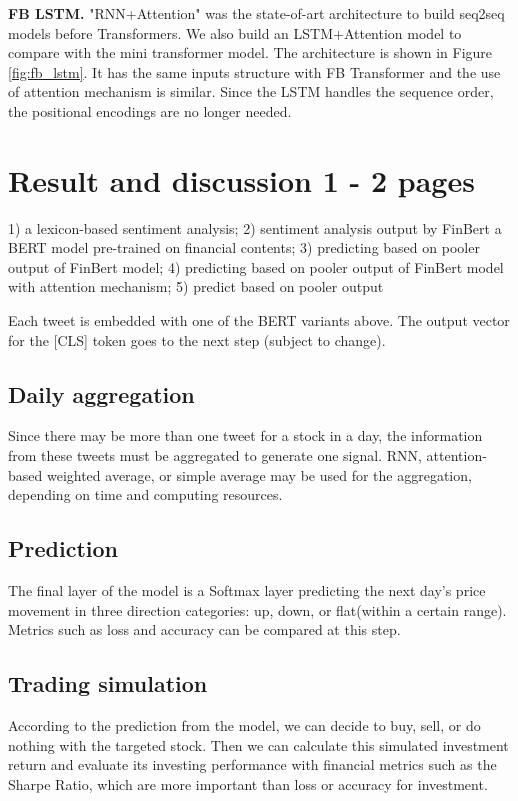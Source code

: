\documentclass[11pt]{article}
\begin{document}
\textbf{FB LSTM.} "RNN+Attention" was the state-of-art architecture to build seq2seq models before Transformers. We also build an LSTM+Attention model to compare with the mini transformer model. The architecture is shown in Figure \ref{fig:fb_lstm}. It has the same inputs structure with FB Transformer and the use of attention mechanism is similar. Since the LSTM handles the sequence order, the positional encodings are no longer needed.

\section{Result and discussion 1 - 2 pages}







1) a lexicon-based sentiment analysis; 2) sentiment analysis output by FinBert a BERT model pre-trained on financial contents; 3) predicting based on pooler output of FinBert model; 4) predicting based on pooler output of FinBert model with attention mechanism; 5) predict based on pooler output 

Each tweet is embedded with one of the BERT variants above. The output vector for the [CLS] token goes to the next step (subject to change).

\subsection{Daily aggregation}
Since there may be more than one tweet for a stock in a day, the information from these tweets must be aggregated to generate one signal. RNN, attention-based weighted average, or simple average may be used for the aggregation, depending on time and computing resources. 

\subsection{Prediction}
The final layer of the model is a Softmax layer predicting the next day's price movement in three direction categories: up, down, or flat(within a certain range). Metrics such as loss and accuracy can be compared at this step.

\subsection{Trading simulation}
According to the prediction from the model, we can decide to buy, sell, or do nothing with the targeted stock. Then we can calculate this simulated investment return and evaluate its investing performance with financial metrics such as the Sharpe Ratio, which are more important than loss or accuracy for investment.
\end{document}
